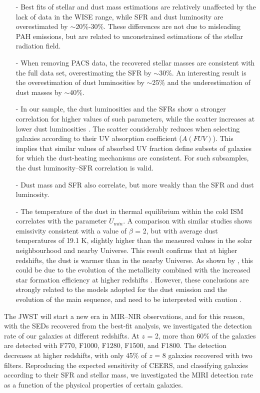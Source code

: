 \documentclass{aa}
\begin{document}
\begin{itemize}
\item[-] Best fits of stellar and dust mass estimations are relatively unaffected by the lack of data in the WISE range, while SFR and dust luminosity are overestimated by $\sim$20\%-30\%. These differences are not due to misleading PAH emissions, but are related to unconstrained estimations of the stellar radiation field.
\item[-] When removing PACS data, the recovered stellar masses are consistent with the full data set, overestimating the SFR by $\sim$30\%. An interesting result is the overestimation of dust luminosities by $\sim$25\% and the underestimation of dust masses by $\sim$40\%. 

\item[-] In our sample, the dust luminosities and the SFRs show a stronger correlation for higher values of such parameters, while the scatter increases at lower dust luminosities \citep{cle,pap2}. The scatter considerably reduces when selecting galaxies according to their UV absorption coefficient ($A(FUV)$). This implies that similar values of absorbed UV fraction define subsets of galaxies for which the dust-heating mechanisms are consistent. For such subsamples, the dust luminosity--SFR correlation is valid.
 \item[-] Dust mass and SFR also correlate, but more weakly than the SFR and dust luminosity.
 \item[-] The temperature of the dust in thermal equilibrium within the cold ISM correlates with the parameter $U_{min}$. A comparison with similar studies shows emissivity consistent with a value of $\beta$ = 2, but with average dust temperatures of 19.1 K, slightly higher than the measured values in the solar neighbourhood and nearby Universe. This result confirms that at higher redshifts, the dust is warmer than in the nearby Universe. As shown by \cite{mag2}, this could be due to the evolution of the metallicity combined with the increased star formation efficiency at higher redshifts \citep{tac}. However, these conclusions are strongly related to the models adopted for the dust emission and the evolution of the main sequence, and need to be interpreted with caution \citep[see also][]{dun}.
\end{itemize}

The JWST will start a new era in MIR--NIR observations, and for this reason, with the SEDs recovered from the best-fit analysis, we investigated the detection rate of our galaxies at different redshifts. At $z$ = 2, more than 60\% of the galaxies are detected with F770, F1000, F1280, F1500, and F1800. The detection decreases at higher redshifts, with only 45\% of $z$ = 8 galaxies recovered with two filters. 
Reproducing the expected sensitivity of CEERS, and classifying galaxies according to their SFR and stellar mass, we investigated the MIRI detection rate as a function of the physical properties of certain galaxies.
\end{document}
